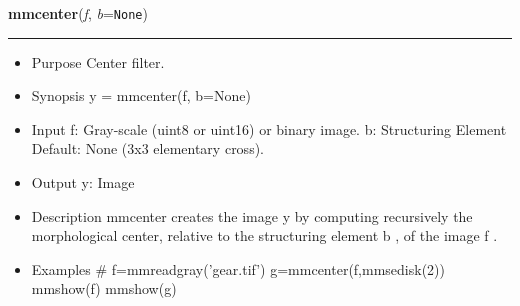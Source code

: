     \begin{boxedminipage}{\textwidth}

    \raggedright \textbf{mmcenter}(\textit{f}, \textit{b}=\texttt{N\-o\-n\-e\-})

    \vspace{-1.5ex}

    \rule{\textwidth}{0.5\fboxrule}
    \begin{itemize}
    \setlength{\parskip}{0.6ex}
      \item Purpose Center filter.

      \item Synopsis y = mmcenter(f, b=None)

      \item Input f: Gray-scale (uint8 or uint16) or binary image. b: 
        Structuring Element Default: None (3x3 elementary cross).

      \item Output y: Image

      \item Description mmcenter creates the image y by computing recursively 
        the morphological center, relative to the structuring element b , 
        of the image f .

      \item Examples \# f=mmreadgray('gear.tif') g=mmcenter(f,mmsedisk(2)) 
        mmshow(f) mmshow(g)

    \end{itemize}

    \vspace{1ex}

    \end{boxedminipage}

    \label{multireg:num_pymorph:mmcero}
    \vspace{0.5ex}

